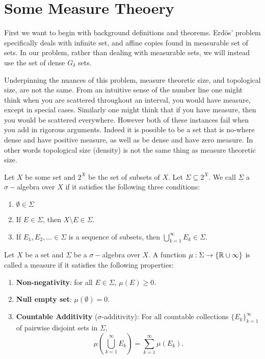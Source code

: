 \section{Some Measure Theoery}

First we want to begin with background definitions and theorems.  Erd\"{o}s' problem specifically deals with infinite set, and affine copies found in measurable set of sets.  In our problem, rather than dealing with measurable sets, we will instead use the set of dense $G_\delta$ sets.  

Underpinning the nuances of this problem, measure theoretic size, and topological size, are not the same. From an intuitive sense of the number line one might think when you are scattered throughout an interval, you would have measure, except in special cases. Similarly one might think that if you have measure, then you would be scattered everywhere.  However both of these instances fail when you add in rigorous arguments.  Indeed it is possible to be a set that is no-where dense and have positive measure, as well as be dense and have zero measure. In other words topological size (density) is not the same thing as measure theoretic size. 




\begin{definition}
    Let $X$ be some set and $2^X$ be the set of subsets of $X$. Let $\Sigma \subseteq 2^X$. We call $\Sigma$ a $\sigma-$algebra over $X$ if it satisfies the following three conditions:
    \begin{enumerate}
        \item $\emptyset \in \Sigma$
        \item If $E \in \Sigma$, then $X\setminus E \in \Sigma$. 
        \item If $E_1, E_2, \dots \in \Sigma$ is a sequence of subsets, then $\bigcup_{k=1}^\infty E_k \in \Sigma$. 
    \end{enumerate}
\end{definition}

\begin{definition}[Measure]
    Let $X$ be a set and $\Sigma$ be a $\sigma-$algebra over $X$.  A function $\mu: \Sigma \to \{\mathbb{R} \cup \infty\}$ is called a measure if it satisfies the following properties:
    \begin{enumerate}
        \item \textbf{Non-negativity}: for all $E \in \Sigma$, $\mu(E)\geq 0$.
        \item \textbf{Null empty set}: $\mu(\emptyset) = 0$. 
        \item \textbf{Countable Additivity} ($\sigma$-additivity): For all countable collections $\{E_k\}_{k=1}^\infty$ of pairwise disjoint sets in $\Sigma$, $$\mu\left( \bigcup_{k=1}^\infty E_k \right) = \sum_{k=1}^\infty \mu(E_k).$$
    \end{enumerate}
\end{definition}

